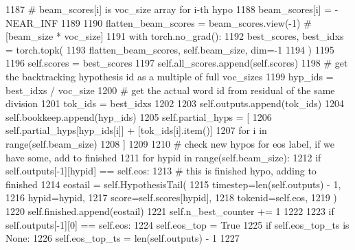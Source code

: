 \begin{DoxyCode}
1187                     \textcolor{comment}{# beam\_scores[i] is voc\_size array for i-th hypo}
1188                     beam\_scores[i] = -NEAR\_INF
1189 
1190         flatten\_beam\_scores = beam\_scores.view(-1)  \textcolor{comment}{# [beam\_size * voc\_size]}
1191         with torch.no\_grad():
1192             best\_scores, best\_idxs = torch.topk(
1193                 flatten\_beam\_scores, self.beam\_size, dim=-1
1194             )
1195 
1196         self.scores = best\_scores
1197         self.all\_scores.append(self.scores)
1198         \textcolor{comment}{# get the backtracking hypothesis id as a multiple of full voc\_sizes}
1199         hyp\_ids = best\_idxs / voc\_size
1200         \textcolor{comment}{# get the actual word id from residual of the same division}
1201         tok\_ids = best\_idxs %
1202 
1203         self.outputs.append(tok\_ids)
1204         self.bookkeep.append(hyp\_ids)
1205         self.partial\_hyps = [
1206             self.partial\_hyps[hyp\_ids[i]] + [tok\_ids[i].item()]
1207             \textcolor{keywordflow}{for} i \textcolor{keywordflow}{in} range(self.beam\_size)
1208         ]
1209 
1210         \textcolor{comment}{#  check new hypos for eos label, if we have some, add to finished}
1211         \textcolor{keywordflow}{for} hypid \textcolor{keywordflow}{in} range(self.beam\_size):
1212             \textcolor{keywordflow}{if} self.outputs[-1][hypid] == self.eos:
1213                 \textcolor{comment}{#  this is finished hypo, adding to finished}
1214                 eostail = self.HypothesisTail(
1215                     timestep=len(self.outputs) - 1,
1216                     hypid=hypid,
1217                     score=self.scores[hypid],
1218                     tokenid=self.eos,
1219                 )
1220                 self.finished.append(eostail)
1221                 self.n\_best\_counter += 1
1222 
1223         \textcolor{keywordflow}{if} self.outputs[-1][0] == self.eos:
1224             self.eos\_top = \textcolor{keyword}{True}
1225             \textcolor{keywordflow}{if} self.eos\_top\_ts \textcolor{keywordflow}{is} \textcolor{keywordtype}{None}:
1226                 self.eos\_top\_ts = len(self.outputs) - 1
1227 
\end{DoxyCode}
\mbox{\label{classparlai_1_1agents_1_1legacy__agents_1_1seq2seq_1_1torch__agent__v1_1_1Beam_a6d43c0169b15e4d6a754a91a25137709}} 
